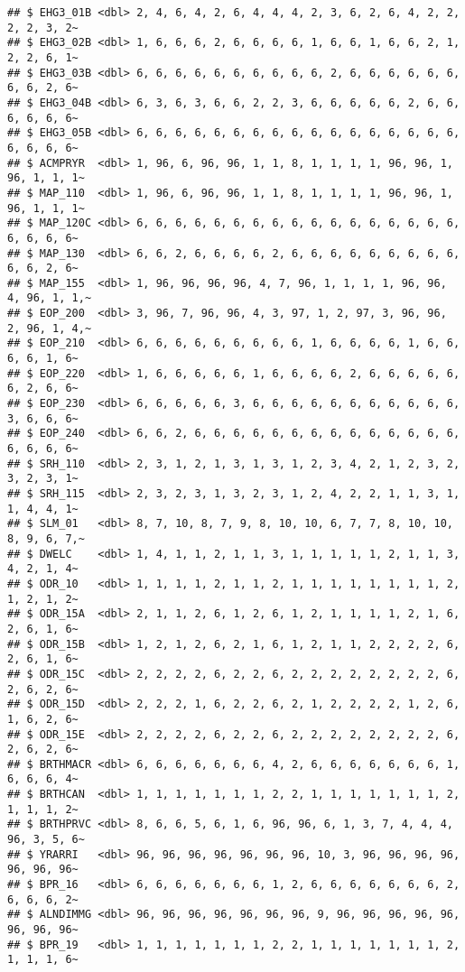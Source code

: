 \documentclass[
]{article}
\begin{document}
\begin{verbatim}
## $ EHG3_01B <dbl> 2, 4, 6, 4, 2, 6, 4, 4, 4, 2, 3, 6, 2, 6, 4, 2, 2, 2, 2, 3, 2~
## $ EHG3_02B <dbl> 1, 6, 6, 6, 2, 6, 6, 6, 6, 1, 6, 6, 1, 6, 6, 2, 1, 2, 2, 6, 1~
## $ EHG3_03B <dbl> 6, 6, 6, 6, 6, 6, 6, 6, 6, 6, 2, 6, 6, 6, 6, 6, 6, 6, 6, 2, 6~
## $ EHG3_04B <dbl> 6, 3, 6, 3, 6, 6, 2, 2, 3, 6, 6, 6, 6, 6, 2, 6, 6, 6, 6, 6, 6~
## $ EHG3_05B <dbl> 6, 6, 6, 6, 6, 6, 6, 6, 6, 6, 6, 6, 6, 6, 6, 6, 6, 6, 6, 6, 6~
## $ ACMPRYR  <dbl> 1, 96, 6, 96, 96, 1, 1, 8, 1, 1, 1, 1, 96, 96, 1, 96, 1, 1, 1~
## $ MAP_110  <dbl> 1, 96, 6, 96, 96, 1, 1, 8, 1, 1, 1, 1, 96, 96, 1, 96, 1, 1, 1~
## $ MAP_120C <dbl> 6, 6, 6, 6, 6, 6, 6, 6, 6, 6, 6, 6, 6, 6, 6, 6, 6, 6, 6, 6, 6~
## $ MAP_130  <dbl> 6, 6, 2, 6, 6, 6, 6, 2, 6, 6, 6, 6, 6, 6, 6, 6, 6, 6, 6, 2, 6~
## $ MAP_155  <dbl> 1, 96, 96, 96, 96, 4, 7, 96, 1, 1, 1, 1, 96, 96, 4, 96, 1, 1,~
## $ EOP_200  <dbl> 3, 96, 7, 96, 96, 4, 3, 97, 1, 2, 97, 3, 96, 96, 2, 96, 1, 4,~
## $ EOP_210  <dbl> 6, 6, 6, 6, 6, 6, 6, 6, 6, 1, 6, 6, 6, 6, 1, 6, 6, 6, 6, 1, 6~
## $ EOP_220  <dbl> 1, 6, 6, 6, 6, 6, 1, 6, 6, 6, 6, 2, 6, 6, 6, 6, 6, 6, 2, 6, 6~
## $ EOP_230  <dbl> 6, 6, 6, 6, 6, 3, 6, 6, 6, 6, 6, 6, 6, 6, 6, 6, 6, 3, 6, 6, 6~
## $ EOP_240  <dbl> 6, 6, 2, 6, 6, 6, 6, 6, 6, 6, 6, 6, 6, 6, 6, 6, 6, 6, 6, 6, 6~
## $ SRH_110  <dbl> 2, 3, 1, 2, 1, 3, 1, 3, 1, 2, 3, 4, 2, 1, 2, 3, 2, 3, 2, 3, 1~
## $ SRH_115  <dbl> 2, 3, 2, 3, 1, 3, 2, 3, 1, 2, 4, 2, 2, 1, 1, 3, 1, 1, 4, 4, 1~
## $ SLM_01   <dbl> 8, 7, 10, 8, 7, 9, 8, 10, 10, 6, 7, 7, 8, 10, 10, 8, 9, 6, 7,~
## $ DWELC    <dbl> 1, 4, 1, 1, 2, 1, 1, 3, 1, 1, 1, 1, 1, 2, 1, 1, 3, 4, 2, 1, 4~
## $ ODR_10   <dbl> 1, 1, 1, 1, 2, 1, 1, 2, 1, 1, 1, 1, 1, 1, 1, 1, 2, 1, 2, 1, 2~
## $ ODR_15A  <dbl> 2, 1, 1, 2, 6, 1, 2, 6, 1, 2, 1, 1, 1, 1, 2, 1, 6, 2, 6, 1, 6~
## $ ODR_15B  <dbl> 1, 2, 1, 2, 6, 2, 1, 6, 1, 2, 1, 1, 2, 2, 2, 2, 6, 2, 6, 1, 6~
## $ ODR_15C  <dbl> 2, 2, 2, 2, 6, 2, 2, 6, 2, 2, 2, 2, 2, 2, 2, 2, 6, 2, 6, 2, 6~
## $ ODR_15D  <dbl> 2, 2, 2, 1, 6, 2, 2, 6, 2, 1, 2, 2, 2, 2, 1, 2, 6, 1, 6, 2, 6~
## $ ODR_15E  <dbl> 2, 2, 2, 2, 6, 2, 2, 6, 2, 2, 2, 2, 2, 2, 2, 2, 6, 2, 6, 2, 6~
## $ BRTHMACR <dbl> 6, 6, 6, 6, 6, 6, 6, 4, 2, 6, 6, 6, 6, 6, 6, 6, 1, 6, 6, 6, 4~
## $ BRTHCAN  <dbl> 1, 1, 1, 1, 1, 1, 1, 2, 2, 1, 1, 1, 1, 1, 1, 1, 2, 1, 1, 1, 2~
## $ BRTHPRVC <dbl> 8, 6, 6, 5, 6, 1, 6, 96, 96, 6, 1, 3, 7, 4, 4, 4, 96, 3, 5, 6~
## $ YRARRI   <dbl> 96, 96, 96, 96, 96, 96, 96, 10, 3, 96, 96, 96, 96, 96, 96, 96~
## $ BPR_16   <dbl> 6, 6, 6, 6, 6, 6, 6, 1, 2, 6, 6, 6, 6, 6, 6, 6, 2, 6, 6, 6, 2~
## $ ALNDIMMG <dbl> 96, 96, 96, 96, 96, 96, 96, 9, 96, 96, 96, 96, 96, 96, 96, 96~
## $ BPR_19   <dbl> 1, 1, 1, 1, 1, 1, 1, 2, 2, 1, 1, 1, 1, 1, 1, 1, 2, 1, 1, 1, 6~

\end{verbatim}
\end{document}
